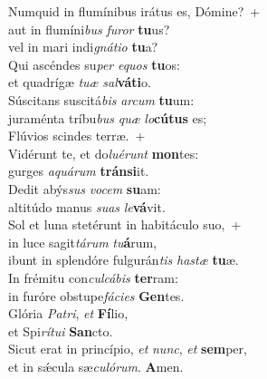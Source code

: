 \evenverse Numquid in flumínibus irátus es, Dómine?~+\\\evenverse  aut in flumíni\textit{bus} \textit{fu}\textit{ror} \textbf{tu}us?~\*\\
\evenverse vel in mari indi\textit{gná}\textit{ti}\textit{o} \textbf{tu}a?\\
\oddverse Qui ascéndes su\textit{per} \textit{e}\textit{quos} \textbf{tu}os:~\*\\
\oddverse et quadrígæ \textit{tu}\textit{æ} \textit{sal}\textbf{vá}\textbf{ti}o.\\
\evenverse Súscitans suscitá\textit{bis} \textit{ar}\textit{cum} \textbf{tu}um:~\*\\
\evenverse juraménta tríbu\textit{bus} \textit{quæ} \textit{lo}\textbf{cú}\textbf{tus} es;\\
\oddverse Flúvios scindes terræ.~+\\
\oddverse  Vidérunt te, et do\textit{lu}\textit{é}\textit{runt} \textbf{mon}tes:~\*\\
\oddverse gurges \textit{a}\textit{quá}\textit{rum} \textbf{trán}\textbf{si}it.\\
\evenverse Dedit abýs\textit{sus} \textit{vo}\textit{cem} \textbf{su}am:~\*\\
\evenverse altitúdo manus \textit{su}\textit{as} \textit{le}\textbf{vá}vit.\\
\oddverse Sol et luna stetérunt in habitáculo suo,~+\\
\oddverse  in luce sagit\textit{tá}\textit{rum} \textit{tu}\textbf{á}rum,~\*\\
\oddverse ibunt in splendóre fulgurán\textit{tis} \textit{ha}\textit{stæ} \textbf{tu}æ.\\
\evenverse In frémitu con\textit{cul}\textit{cá}\textit{bis} \textbf{ter}ram:~\*\\
\evenverse in furóre obstupe\textit{fá}\textit{ci}\textit{es} \textbf{Gen}tes.\\
\oddverse Glória \textit{Pa}\textit{tri}, \textit{et} \textbf{Fí}lio,~\*\\
\oddverse et Spi\textit{rí}\textit{tu}\textit{i} \textbf{San}cto.\\
\evenverse Sicut erat in princípio, \textit{et} \textit{nunc}, \textit{et} \textbf{sem}per,~\*\\
\evenverse et in sǽcula sæ\textit{cu}\textit{ló}\textit{rum}. \textbf{A}men.\\
